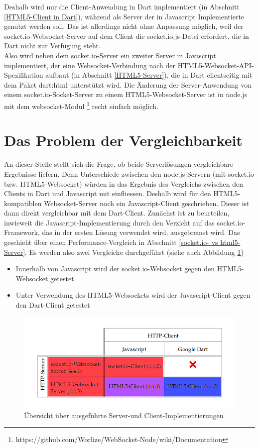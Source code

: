 Deshalb wird nur die Client-Anwendung in Dart implementiert (in Abschnitt \ref{HTML5-Client in Dart}), während als Server der in Javascript Implementierte genutzt werden soll. Das ist allerdings nicht ohne Anpassung möglich, weil der socket.io-Websocket-Server auf dem Client die socket.io.js-Datei erfordert, die in Dart nicht zur Verfügung steht. \\Also wird neben dem socket.io-Server ein zweiter Server in Javascript implementiert, der eine Websocket-Verbindung nach der HTML5-Websocket-API-Spezifikation aufbaut (in Abschnitt \ref{HTML5-Server}), die in Dart clientseitig mit dem Paket dart:html unterstützt wird. Die Änderung der Server-Anwendung von einem socket.io-Socket-Server zu einem HTML5-Websocket-Server ist in node.js mit dem websocket-Modul  \footnote{https://github.com/Worlize/WebSocket-Node/wiki/Documentation} recht einfach möglich.
\section{Das Problem der Vergleichbarkeit}\label{Vergleichbarkeit}
An dieser Stelle stellt sich die Frage, ob beide Serverlösungen vergleichbare Ergebnisse liefern. Denn Unterschiede zwischen den node.js-Servern (mit socket.io bzw. HTML5-Websocket) würden in das Ergebnis des Vergleichs zwischen den Clients in Dart und Javascript mit einfliessen. Deshalb wird für den HTML5-kompatiblen Websocket-Server noch ein Javascript-Client geschrieben. Dieser ist dann direkt vergleichbar mit dem Dart-Client.
Zunächst ist zu beurteilen, inwieweit die Javascript-Implementierung durch den Verzicht auf das socket.io-Framework, das in der ersten Lösung verwendet wird, ausgebremst wird. Das geschieht über einen Performance-Vergleich in Abschnitt \ref {socket.io- vs html5-Server}.
Es werden also zwei Vergleiche durchgeführt (siehe auch Abbildung \ref{tab:uebersicht}) 
\begin{itemize}
\item Innerhalb von Javascript wird der socket.io-Websocket gegen den HTML5-Websocket getestet.
\item Unter Verwendung des HTML5-Websockets wird der Javascript-Client gegen den Dart-Client getestet
\end{itemize}
\begin{figure}[H]
  \centering
  \includegraphics[width=6in]{images/tabelle.png}
  \caption[Übersicht über ausgeführte Server-und Clientimplementierungen]{Übersicht über ausgeführte Server-und Client-Implementierungen}
  \label{tab:uebersicht}
\end{figure}

